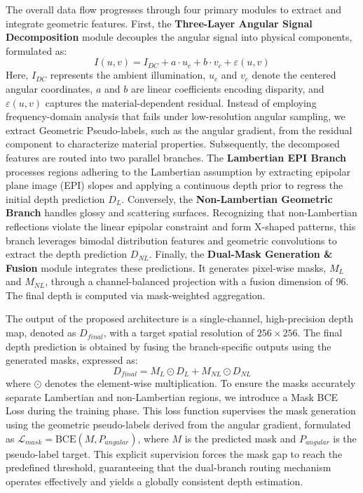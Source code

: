 \documentclass[lettersize,journal]{IEEEtran}
\begin{document}
The overall data flow progresses through four primary modules to extract and integrate geometric features. First, the \textbf{Three-Layer Angular Signal Decomposition} module decouples the angular signal into physical components, formulated as:
\begin{equation}
\label{eq:eq1}
I(u,v) = I_{DC} + a \cdot u_c + b \cdot v_c + \varepsilon(u,v)
\end{equation}
Here, $I_{DC}$ represents the ambient illumination, $u_c$ and $v_c$ denote the centered angular coordinates, $a$ and $b$ are linear coefficients encoding disparity, and $\varepsilon(u,v)$ captures the material-dependent residual. Instead of employing frequency-domain analysis that fails under low-resolution angular sampling, we extract Geometric Pseudo-labels, such as the angular gradient, from the residual component to characterize material properties. Subsequently, the decomposed features are routed into two parallel branches. The \textbf{Lambertian EPI Branch} processes regions adhering to the Lambertian assumption by extracting epipolar plane image (EPI) slopes  and applying a continuous depth prior to regress the initial depth prediction $D_L$. Conversely, the \textbf{Non-Lambertian Geometric Branch} handles glossy and scattering surfaces. Recognizing that non-Lambertian reflections violate the linear epipolar constraint and form X-shaped patterns, this branch leverages bimodal distribution features and geometric convolutions to extract the depth prediction $D_{NL}$. Finally, the \textbf{Dual-Mask Generation & Fusion} module integrates these predictions. It generates pixel-wise masks, $M_L$ and $M_{NL}$, through a channel-balanced projection with a fusion dimension of 96. The final depth is computed via mask-weighted aggregation.

The output of the proposed architecture is a single-channel, high-precision depth map, denoted as $D_{final}$, with a target spatial resolution of $256 \times 256$. The final depth prediction is obtained by fusing the branch-specific outputs using the generated masks, expressed as:
\begin{equation}
\label{eq:eq2}
D_{final} = M_L \odot D_L + M_{NL} \odot D_{NL}
\end{equation}
where $\odot$ denotes the element-wise multiplication. To ensure the masks accurately separate Lambertian and non-Lambertian regions, we introduce a Mask BCE Loss during the training phase. This loss function supervises the mask generation using the geometric pseudo-labels derived from the angular gradient, formulated as $\mathcal{L}_{mask} = \text{BCE}(M, P_{angular})$, where $M$ is the predicted mask and $P_{angular}$ is the pseudo-label target. This explicit supervision forces the mask gap to reach the predefined threshold, guaranteeing that the dual-branch routing mechanism operates effectively and yields a globally consistent depth estimation.
\end{document}
